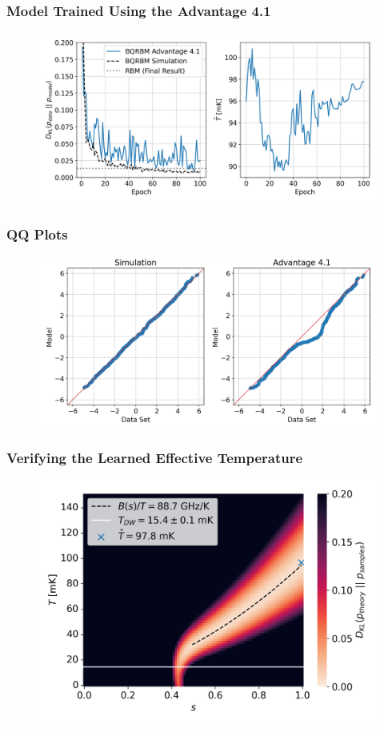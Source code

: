 \documentclass{beamer}
\begin{document}
\begin{frame}
    \frametitle{Model Trained Using the Advantage 4.1}
    \begin{figure}
        \includegraphics[width=1\linewidth]{qbm/8x4/Advantage_system4.1/train_results_annealer.png}
    \end{figure}
\end{frame}

\begin{frame}
    \frametitle{QQ Plots}
    \begin{figure}
        \includegraphics[width=1\linewidth]{qbm/8x4/Advantage_system4.1/qq_comparison.png}
    \end{figure}
\end{frame}

\begin{frame}
    \frametitle{Verifying the Learned Effective Temperature}
    \begin{figure}
        \includegraphics[width=0.9\linewidth]{qbm/8x4/Advantage_system4.1/effective_temperature.png}
    \end{figure}
\end{frame}
\end{document}
